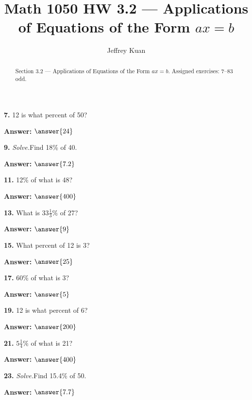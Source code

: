 \documentclass{ximera}
\author{Jeffrey Kuan}
\title{Math 1050 HW 3.2 --- Applications of Equations of the Form $ax = b$}
\begin{document}
\begin{abstract}
    Section 3.2 --- Applications of Equations of the Form $ax = b$.
    Assigned exercises: 7–83 odd.
\end{abstract}

\maketitle

\begin{problem}
\textbf{7.} 12 is what percent of 50?

\textbf{Answer:} $\answer{24}$
\end{problem}

\begin{problem}
\textbf{9.} \emph{Solve.}\quad Find 18\% of 40.

\textbf{Answer:} $\answer{7.2}$
\end{problem}

\begin{problem}
\textbf{11.} 12\% of what is 48?

\textbf{Answer:} $\answer{400}$
\end{problem}

\begin{problem}
\textbf{13.} What is $33\frac{1}{3}\%$ of 27?

\textbf{Answer:} $\answer{9}$
\end{problem}

\begin{problem}
\textbf{15.} What percent of 12 is 3?

\textbf{Answer:} $\answer{25}$
\end{problem}

\begin{problem}
\textbf{17.} 60\% of what is 3?

\textbf{Answer:} $\answer{5}$
\end{problem}

\begin{problem}
\textbf{19.} 12 is what percent of 6?

\textbf{Answer:} $\answer{200}$
\end{problem}

\begin{problem}
\textbf{21.} $5\frac{1}{4}\%$ of what is 21?

\textbf{Answer:} $\answer{400}$
\end{problem}

\begin{problem}
\textbf{23.} \emph{Solve.}\quad Find 15.4\% of 50.

\textbf{Answer:} $\answer{7.7}$
\end{problem}
\end{document}
